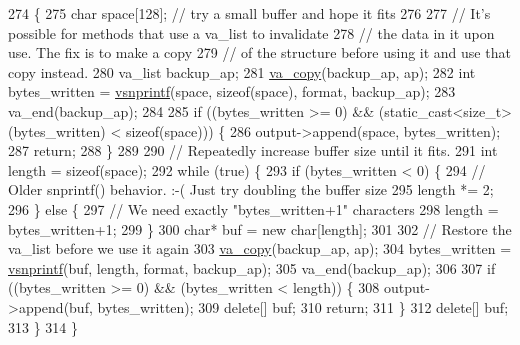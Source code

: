 \begin{DoxyCode}
274                                              \{
275   \textcolor{keywordtype}{char} space[128];    \textcolor{comment}{// try a small buffer and hope it fits}
276 
277   \textcolor{comment}{// It's possible for methods that use a va\_list to invalidate}
278   \textcolor{comment}{// the data in it upon use.  The fix is to make a copy}
279   \textcolor{comment}{// of the structure before using it and use that copy instead.}
280   va\_list backup\_ap;
281   \hyperlink{windows__port_8h_ad36243a66d6b30f74fd72dd0f78d7264}{va\_copy}(backup\_ap, ap);
282   \textcolor{keywordtype}{int} bytes\_written = \hyperlink{windows__port_8h_a8b84c05ed8508ce17920a30acae325ab}{vsnprintf}(space, \textcolor{keyword}{sizeof}(space), format, backup\_ap);
283   va\_end(backup\_ap);
284 
285   \textcolor{keywordflow}{if} ((bytes\_written >= 0) && (static\_cast<size\_t>(bytes\_written) < \textcolor{keyword}{sizeof}(space))) \{
286     output->append(space, bytes\_written);
287     \textcolor{keywordflow}{return};
288   \}
289 
290   \textcolor{comment}{// Repeatedly increase buffer size until it fits.}
291   \textcolor{keywordtype}{int} length = \textcolor{keyword}{sizeof}(space);
292   \textcolor{keywordflow}{while} (\textcolor{keyword}{true}) \{
293     \textcolor{keywordflow}{if} (bytes\_written < 0) \{
294       \textcolor{comment}{// Older snprintf() behavior. :-(  Just try doubling the buffer size}
295       length *= 2;
296     \} \textcolor{keywordflow}{else} \{
297       \textcolor{comment}{// We need exactly "bytes\_written+1" characters}
298       length = bytes\_written+1;
299     \}
300     \textcolor{keywordtype}{char}* buf = \textcolor{keyword}{new} \textcolor{keywordtype}{char}[length];
301 
302     \textcolor{comment}{// Restore the va\_list before we use it again}
303     \hyperlink{windows__port_8h_ad36243a66d6b30f74fd72dd0f78d7264}{va\_copy}(backup\_ap, ap);
304     bytes\_written = \hyperlink{windows__port_8h_a8b84c05ed8508ce17920a30acae325ab}{vsnprintf}(buf, length, format, backup\_ap);
305     va\_end(backup\_ap);
306 
307     \textcolor{keywordflow}{if} ((bytes\_written >= 0) && (bytes\_written < length)) \{
308       output->append(buf, bytes\_written);
309       \textcolor{keyword}{delete}[] buf;
310       \textcolor{keywordflow}{return};
311     \}
312     \textcolor{keyword}{delete}[] buf;
313   \}
314 \}
\end{DoxyCode}
